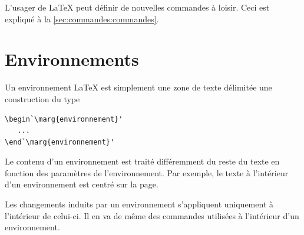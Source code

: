 L'usager de {\LaTeX} peut définir de nouvelles commandes à loisir.
Ceci est expliqué à la \autoref{sec:commandes:commandes}.


\section{Environnements}
\label{chap:bases:environnements}

Un environnement {\LaTeX} est simplement une zone de texte délimitée
une construction du type
\begin{lstlisting}
\begin`\marg{environnement}'
   ...
\end`\marg{environnement}'
\end{lstlisting}
Le contenu d'un environnement est traité différemment du reste du
texte en fonction des paramètres de l'environnement. Par exemple, le
texte à l'intérieur d'un environnement  est centré sur la
page.

Les changements induits par un environnement s'appliquent uniquement à
l'intérieur de celui-ci. Il en va de même des commandes utilisées à
l'intérieur d'un environnement.

